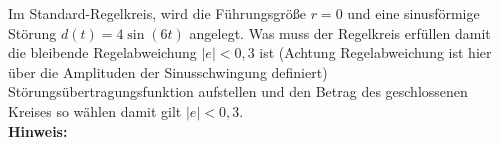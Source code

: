 \begin{question}[section=4,name={Regelabweichung},difficulty=,type=mdl,tags={}]
	Im Standard-Regelkreis, wird die Führungsgröße $r=0$ und eine sinusförmige Störung $d(t) = 4 \sin(6t)$ angelegt. Was muss der Regelkreis erfüllen damit die bleibende Regelabweichung $|e| < 0,3$ ist (Achtung Regelabweichung ist hier über die Amplituden der Sinusschwingung definiert) Störungsübertragungsfunktion aufstellen und den Betrag des geschlossenen Kreises so wählen damit gilt $|e| < 0,3$.
	\\ \textbf{Hinweis:}\\
	
\end{question}
\begin{solution}
	
\end{solution}